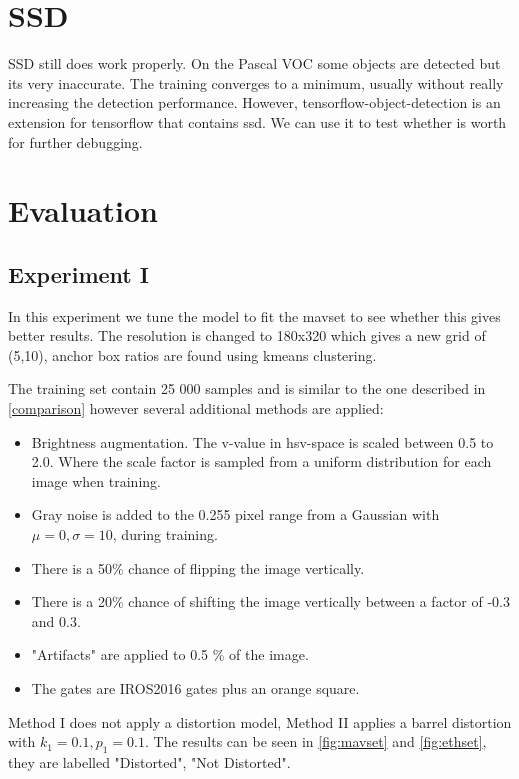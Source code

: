 \documentclass{article}
\begin{document}
%
\section{SSD}

SSD still does work properly. On the Pascal VOC some objects are detected but its very inaccurate. The training converges to a minimum, usually without really increasing the detection performance. However, tensorflow-object-detection is an extension for tensorflow that contains ssd. We can use it to test whether is worth for further debugging.

\section{Evaluation}

\subsection{Experiment I}

In this experiment we tune the model to fit the mavset to see whether this gives better results. The resolution is changed to 180x320 which gives a new grid of (5,10), anchor box ratios are found using kmeans clustering. 

The training set contain 25 000 samples and is similar to the one described in \autoref{comparison} however several additional methods are applied:
\begin{itemize}
	\item Brightness augmentation. The v-value in hsv-space is scaled between 0.5 to 2.0. Where the scale factor is sampled from a uniform distribution for each image when training.
	\item Gray noise is added to the 0.255 pixel range from a Gaussian with $\mu =0, \sigma=10$, during training.
	\item There is a 50\% chance of flipping the image vertically.
	\item There is a 20\% chance of shifting the image vertically between a factor of -0.3 and 0.3.
	\item "Artifacts" are applied to 0.5 \% of the image.
	\item The gates are IROS2016 gates plus an orange square.
\end{itemize}

Method I does not apply a distortion model, Method II applies a barrel distortion with $k_1 = 0.1, p_1=0.1$.  The results can be seen in \autoref{fig:mavset} and \autoref{fig:ethset}, they are labelled "Distorted", "Not Distorted".
\end{document}
